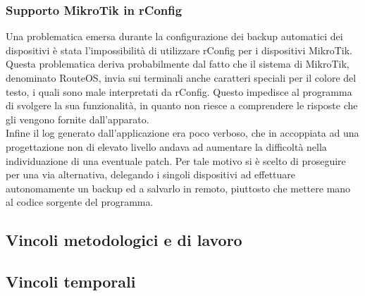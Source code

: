 \documentclass[Tesi.tex]{subfiles}
\begin{document}
\subsubsection{Supporto MikroTik in rConfig}
Una problematica emersa durante la configurazione dei backup automatici dei dispositivi è stata l'impossibilità di utilizzare rConfig per i dispositivi MikroTik. \\
Questa problematica deriva probabilmente dal fatto che il sistema di MikroTik, denominato RouteOS, invia sui terminali anche caratteri speciali per il colore del testo, i quali sono male interpretati da rConfig. Questo impedisce al programma di svolgere la sua funzionalità, in quanto non riesce a comprendere le risposte che gli vengono fornite dall'apparato. \\
Infine il log generato dall'applicazione era poco verboso, che in accoppiata ad una progettazione non di elevato livello andava ad aumentare la difficoltà nella individuazione di una eventuale patch. Per tale motivo si è scelto di proseguire per una via alternativa, delegando i singoli dispositivi ad effettuare autonomamente un backup ed a salvarlo in remoto, piuttosto che mettere mano al codice sorgente del programma.

\subsection{Vincoli metodologici e di lavoro}

\subsection{Vincoli temporali}
\end{document}
